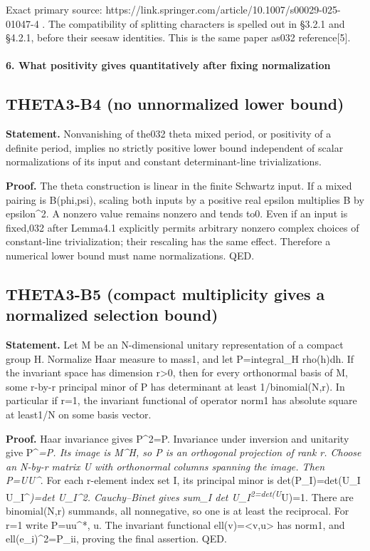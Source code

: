 Exact primary source: https://link.springer.com/article/10.1007/s00029-025-01047-4 . The compatibility of splitting characters is spelled out in §3.2.1 and §4.2.1, before their seesaw identities. This is the same paper as032 reference{[}5{]}.

\paragraph{6. What positivity gives quantitatively after fixing normalization}\label{what-positivity-gives-quantitatively-after-fixing-normalization}

\subsection{THETA3-B4 (no unnormalized lower bound)}\label{theta3-b4-no-unnormalized-lower-bound}\label{B4}

\textbf{Statement.} Nonvanishing of the032 theta mixed period, or positivity of a definite period, implies no strictly positive lower bound independent of scalar normalizations of its input and constant determinant-line trivializations.

\textbf{Proof.} The theta construction is linear in the finite Schwartz input. If a mixed pairing is B(phi,psi), scaling both inputs by a positive real epsilon multiplies B by epsilon\^{}2. A nonzero value remains nonzero and tends to0. Even if an input is fixed,032 after Lemma4.1 explicitly permits arbitrary nonzero complex choices of constant-line trivialization; their rescaling has the same effect. Therefore a numerical lower bound must name normalizations. QED.

\subsection{THETA3-B5 (compact multiplicity gives a normalized selection bound)}\label{theta3-b5-compact-multiplicity-gives-a-normalized-selection-bound}\label{B5}

\textbf{Statement.} Let M be an N-dimensional unitary representation of a compact group H. Normalize Haar measure to mass1, and let P=integral\_H rho(h)dh. If the invariant space has dimension r\textgreater0, then for every orthonormal basis of M, some r-by-r principal minor of P has determinant at least 1/binomial(N,r). In particular if r=1, the invariant functional of operator norm1 has absolute square at least1/N on some basis vector.

\textbf{Proof.} Haar invariance gives P\^{}2=P. Invariance under inversion and unitarity give P\^{}\emph{=P. Its image is M\^{}H, so P is an orthogonal projection of rank r. Choose an N-by-r matrix U with orthonormal columns spanning the image. Then P=UU\^{}}. For each r-element index set I, its principal minor is det(P\_I)=det(U\_I U\_I\^{}\emph{)=\textbar det U\_I\textbar\^{}2. Cauchy--Binet gives sum\_I \textbar det U\_I\textbar{}\textsuperscript{2=det(U}}U)=1. There are binomial(N,r) summands, all nonnegative, so one is at least the reciprocal. For r=1 write P=uu\^{}*, \textbar\textbar u\textbar{}. The invariant functional ell(v)=\textless v,u\textgreater{} has norm1, and \textbar ell(e\_i)\textbar\^{}2=P\_ii, proving the final assertion. QED.

